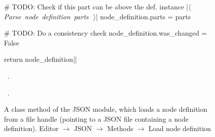 \documentclass[%
    a4paper,    %
    justified,  %
    nobib,      %
    openany     %
]{tufte-book}
\makeatletter
\renewcommand{\label}[1]{\@tufte@label{##1}}%
\makeatother
\begin{document}
\begin{figure}[!htbp]
\begin{flushleft}
\begin{minipage}{\linewidth}
\begin{pythoncode}
    # TODO: Check if this part can be above the def. instance
    |\hbox{$\langle\,${\itshape Parse node definition parts}\nobreak\ {\footnotesize {}}$\,\rangle$}|
    node_definition.parts = parts

    # TODO: Do a consistency check
    node_definition.was_changed = False

    return node_definition|\NWsep|
\end{pythoncode}
\vspace{1.5ex}
\footnotesize
\begin{list}{}{\setlength{\itemsep}{-\parsep}\setlength{\itemindent}{-\leftmargin}}
\item \NWtxtMacroDefBy\ .
\item \NWtxtMacroRefIn\ .

\item{}
\end{list}
\end{minipage}\vspace{4ex}
\end{flushleft}
\caption{A class method of the JSON module, which loads a node definition from a
  file handle (pointing to a JSON file containing a node definition).
  \newline{}\newline{}Editor $\rightarrow$ JSON $\rightarrow$
  Methods $\rightarrow$ Load node definition}
\end{figure}
\end{document}
